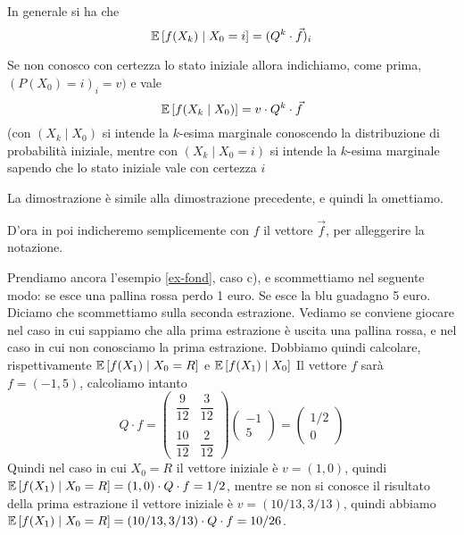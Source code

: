 \begin{prop}
In generale si ha che 
$$\mathbb{E}\left[f(X_k) \mid X_0 = i\right] = (Q^k\cdot \vec{f})_i $$

Se non conosco con certezza lo stato iniziale allora indichiamo, come prima, $ (P(X_0) =i)_i = v) $
e vale
\begin{equation*}
\mathbb{E}\left[f(X_k \mid X_0)\right] =v\cdot Q^k \cdot \vec{f}
\end{equation*}
(con $(X_k \mid X_0) $ si intende la $k$-esima marginale conoscendo la distribuzione di probabilit\`a iniziale, 
mentre con $(X_k \mid X_0=i) $ si intende la $k$-esima marginale sapendo che lo stato 
iniziale vale con certezza $i$
\end{prop}
La dimostrazione \`e simile alla dimostrazione precedente, e quindi la omettiamo.

D'ora in poi indicheremo semplicemente con $f$ il vettore $\vec{f}$, per alleggerire la notazione.


\begin{exrc} 
Prendiamo ancora l'esempio \ref{ex-fond}, caso c), e scommettiamo nel seguente modo:
se esce una pallina rossa perdo 1 euro. Se esce la blu guadagno 5 euro. Diciamo che scommettiamo sulla 
seconda estrazione. Vediamo se conviene giocare nel caso in cui sappiamo che alla prima estrazione \`e 
uscita una pallina rossa, e nel caso in cui non conosciamo la prima estrazione. 
Dobbiamo quindi calcolare, rispettivamente  $\mathbb{E}\left[f(X_1) \mid X_0 = R\right]$ e  $\mathbb{E}\left[f(X_1) \mid X_0 \right]$
Il vettore $f$ sar\`a $f=(-1,5)$, calcoliamo intanto 
	\begin{equation*}
		Q\cdot {f} = \begin{pmatrix}
	\dfrac{9}{12} & \dfrac{3}{12} \\
	&\\
	\dfrac{10}{12} & \dfrac{2}{12}
	\end{pmatrix} \begin{pmatrix}
	-1 \\ 5
	\end{pmatrix} = \begin{pmatrix}
	1/2 \\ 0
	\end{pmatrix} 	
	\end{equation*}
Quindi nel caso in cui $X_0=R$ il vettore iniziale \`e $v=(1,0)$, quindi 
  $\mathbb{E}\left[f(X_1) \mid X_0 = R\right]=(1,0)\cdot Q\cdot {f} =1/2$, mentre se non si conosce il risultato della prima estrazione il vettore iniziale \`e $v=(10/13,3/13)$, quindi abbiamo 
   $\mathbb{E}\left[f(X_1) \mid X_0 = R\right]=(10/13,3/13)\cdot Q\cdot {f} =10/26$.
  \end{exrc}


